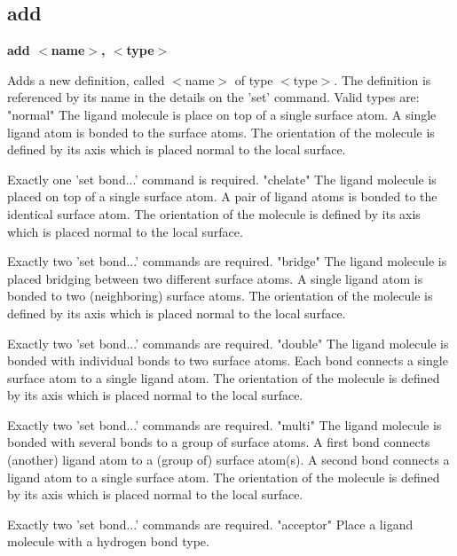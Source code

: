 \subsection*{add}
{\bf add $ <$name$> $, $ <$type$> $ \par }
\vspace{3pt}
Adds a new definition, called $ <$name$> $ of type $ <$type$> $. 
The definition is referenced by its name in the details on the 'set' command. 
Valid types are: 
"normal"   The ligand molecule is place on top of a single surface atom. 
           A single ligand atom is bonded to the surface atoms. 
           The orientation of the molecule is defined by its axis which is 
           placed normal to the local surface. 
\par
           Exactly one 'set bond...' command is required. 
"chelate"  The ligand molecule is placed on top of a single surface atom. 
           A pair of ligand atoms is bonded to the identical surface atom. 
           The orientation of the molecule is defined by its axis which is 
           placed normal to the local surface. 
\par
           Exactly two 'set bond...' commands are required. 
"bridge"   The ligand molecule is placed bridging between two different 
           surface atoms. 
           A single ligand atom is bonded to two (neighboring) surface atoms. 
           The orientation of the molecule is defined by its axis which is 
           placed normal to the local surface. 
\par
           Exactly two 'set bond...' commands are required. 
"double"   The ligand molecule is bonded with individual bonds to two surface 
           atoms. Each bond connects a single surface atom to a single 
           ligand atom. 
           The orientation of the molecule is defined by its axis which is 
           placed normal to the local surface. 
\par
           Exactly two 'set bond...' commands are required. 
"multi"    The ligand molecule is bonded with several bonds to a group of 
           surface atoms. 
           A first bond connects (another) ligand atom to 
           a (group of) surface atom(s). 
           A second bond connects a ligand atom to a single surface atom. 
           The orientation of the molecule is defined by its axis which is 
           placed normal to the local surface. 
\par
           Exactly two 'set bond...' commands are required. 
"acceptor" Place a ligand molecule with a hydrogen bond type. 
